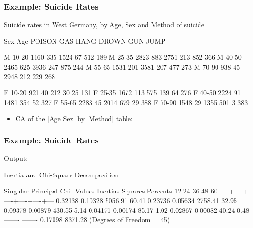 \begin{frame}[fragile]
  \frametitle{Example: Suicide Rates}
Suicide rates in West Germany, by Age, Sex and Method of suicide
\begin{Output}[baselinestretch=0.9]
   Sex  Age    POISON     GAS    HANG   DROWN     GUN    JUMP

    M  10-20     1160     335    1524      67     512     189
    M  25-35     2823     883    2751     213     852     366
    M  40-50     2465     625    3936     247     875     244
    M  55-65     1531     201    3581     207     477     273
    M  70-90      938      45    2948     212     229     268

    F  10-20      921      40     212      30      25     131
    F  25-35     1672     113     575     139      64     276
    F  40-50     2224      91    1481     354      52     327
    F  55-65     2283      45    2014     679      29     388
    F  70-90     1548      29    1355     501       3     383
\end{Output}
  \begin{itemize}
	\item CA of the [Age Sex] by [Method] table:
  \end{itemize}
\end{frame}

\begin{frame}[fragile]
  \frametitle{Example: Suicide Rates}
\vspace{2ex}
Output:
\begin{Output}[fontsize=\footnotesize,baselinestretch=0.8]
                   Inertia and Chi-Square Decomposition

     Singular  Principal Chi-
     Values    Inertias  Squares Percents   12   24   36   48   60
                                         ----+----+----+----+----+---
     0.32138   0.10328   5056.91  60.41%
     0.23736   0.05634   2758.41  32.95%
     0.09378   0.00879    430.55   5.14%
     0.04171   0.00174     85.17   1.02%
     0.02867   0.00082     40.24   0.48%
               -------   -------
               0.17098   8371.28 (Degrees of Freedom = 45)
\end{Output}
\end{frame}

